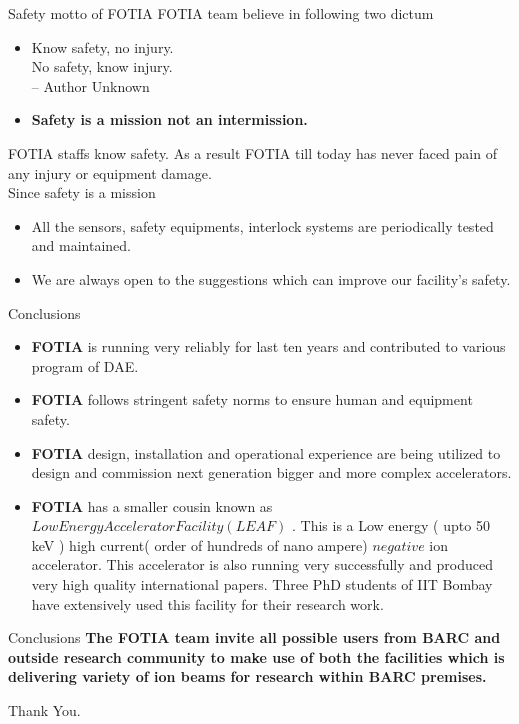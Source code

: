 \documentclass[11pt]{beamer}
\begin{document}
\begin{frame}{Safety motto of FOTIA}
FOTIA team believe in following two dictum
\begin{itemize}
\item Know safety, no injury.\\
     No safety, know injury. \\
      -- Author Unknown			
\item \textbf{Safety is a mission not an intermission.} 
\end{itemize} 

FOTIA staffs know safety. As a result FOTIA till today has never faced pain of any injury or equipment damage.\\
Since safety is a mission 
\begin{itemize}
\item 	All the sensors, safety equipments, interlock systems are periodically tested and maintained.
\item 	We are always open to the suggestions which can improve our facility's safety.	
 
\end{itemize} 

\end{frame}



\begin{frame}{Conclusions}
\begin{itemize}

\item \textbf{FOTIA} is running very reliably for last ten years and contributed to various program of DAE.

\item \textbf{FOTIA} follows stringent safety norms to ensure human and equipment safety.

\item \textbf{FOTIA} design, installation and operational experience are being utilized to design and commission next generation bigger and more complex accelerators.

\item \textbf{FOTIA} has a smaller cousin known as $Low Energy Accelerator Facility ( LEAF)$ . This is a Low energy ( upto 50 keV ) high current( order of hundreds of nano ampere) $negative$ ion accelerator. This accelerator is also running very successfully and produced very high quality international papers. Three PhD students of IIT Bombay have extensively used this facility for their research work.



\end{itemize}
\end{frame}

\begin{frame}{Conclusions}
 \textbf{The FOTIA team invite all possible users from BARC and outside research community to make use of both the facilities which is delivering variety of ion beams for research within BARC premises.}\\
 
 \begin{center}
  \huge {Thank You.}
\end{center}
\end{frame}
\end{document}
